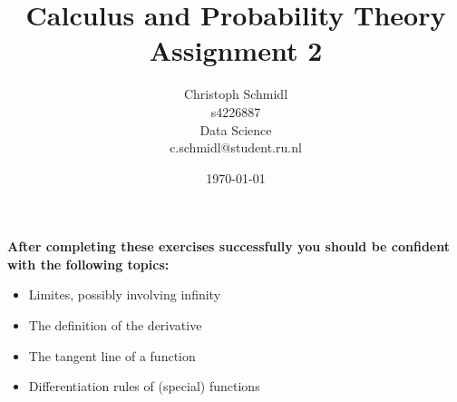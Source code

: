 \documentclass[a4paper]{article}
\title{Calculus and Probability Theory\\ Assignment 2}
\author{Christoph Schmidl\\
s4226887\\
Data Science\\
c.schmidl@student.ru.nl\\}
\date{\today}
\begin{document}
\maketitle

\textbf{After completing these exercises successfully you should be confident with the following topics:}

\begin{itemize}
	\item Limites, possibly involving infinity
	\item The definition of the derivative
	\item The tangent line of a function
	\item Differentiation rules of (special) functions
\end{itemize}
\vspace{1em}
\end{document}
